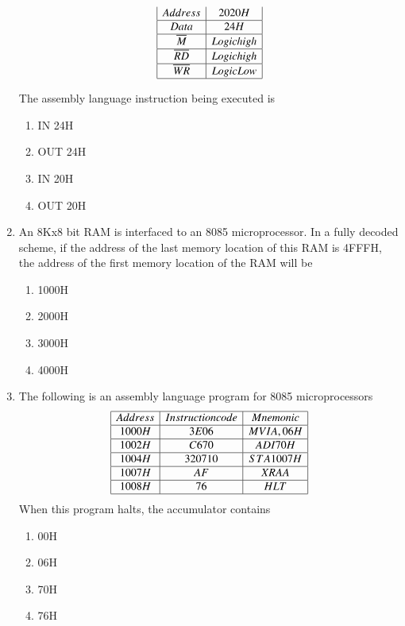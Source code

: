 \documentclass[journal,12pt,twocolumn]{IEEEtran}
\begin{document}
\begin{enumerate}
\begin{displaymath}
\begin{array}{|c|c|}
Address & 2020H  \\\hline
Data & 24H  \\ \hline
{\overline{M}} & Logic high    \\\hline
{\overline{RD}} & Logic high  \\\hline
{\overline{WR}} & Logic Low  \\\hline
\end{array}
\end{displaymath}

The assembly language instruction being executed is
      \begin{enumerate}
      \item IN 24H
      \item OUT 24H
      \item IN 20H
      \item OUT 20H
    \end{enumerate}
    \item An 8Kx8 bit RAM is interfaced to an 8085 microprocessor. In a fully decoded
scheme, if the address of the last memory location of this RAM is 4FFFH, the
address of the first memory location of the RAM will be 
      \begin{enumerate}                  
      \item 1000H
      \item 2000H
      \item 3000H
      \item 4000H
      \end{enumerate}
\item The following is an assembly language program for 8085 microprocessors
\begin{displaymath}
\begin{array}{|c|c|c|} \hline


Address & Instruction code & Mnemonic   \\\hline
1000H & 3E06 & MVI A, 06H \\ \hline
1002H & C670 & ADI 70H    \\\hline
1004H & 3207 10 & STA 1007H  \\\hline
1007H & AF & XRA A \\\hline
1008H & 76 & HLT \\\hline
\end{array}
\end{displaymath}
When this program halts, the accumulator contains
     \begin{enumerate}
      \item 00H
      \item 06H
      \item 70H
      \item 76H
    \end{enumerate}    
   

\end{enumerate}
\end{document}
